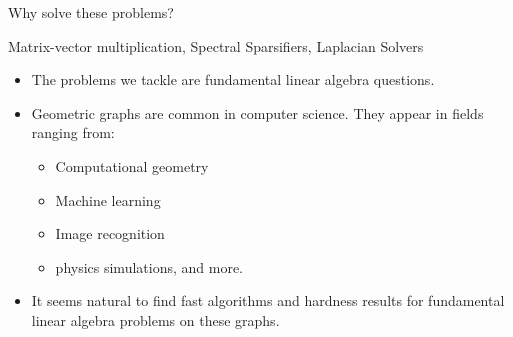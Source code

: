 
\begin{frame}{Why solve these problems?}

  {\color{red}Matrix-vector multiplication}, {\color{darkblue}Spectral
  Sparsifiers}, {\color{darkgreen} Laplacian Solvers}
\begin{itemize}
  \item <+-> The problems we tackle are fundamental linear algebra
    questions.
  \item <+-> Geometric graphs are common in computer science. They
    appear in fields
    ranging from: 
    \begin{itemize}
      \item Computational geometry
      \item Machine learning
      \item Image recognition
      \item physics simulations, and more.
    \end{itemize}
  \item <+-> It seems natural to find fast algorithms and hardness
    results for fundamental linear algebra problems on these graphs.
\end{itemize}
\end{frame}

